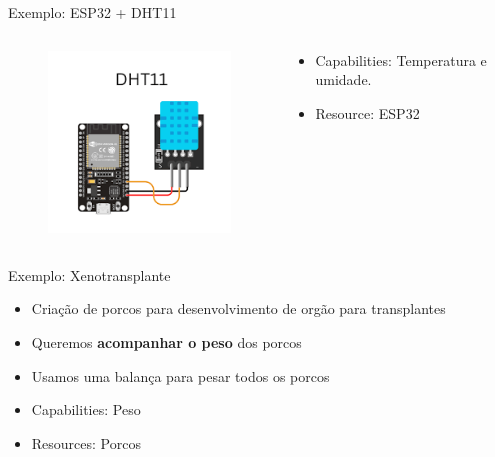 \documentclass[aspectratio=169,xcolor=dvipsnames]{beamer}
\begin{document}
\begin{frame}{Exemplo: ESP32 + DHT11}
\begin{columns}
    \begin{column}{0.48\textwidth}
    \begin{figure}
    \centering
    \includegraphics[width=1\linewidth]{Figuras/DHT11-ESP32.png}
    \end{figure}
    \end{column}
    \begin{column}{0.48\textwidth}
    \begin{itemize}
        \item Capabilities: Temperatura e umidade.
        \item Resource: ESP32
    \end{itemize}
    \end{column}

\end{columns}

\end{frame}

\begin{frame}{Exemplo: Xenotransplante}
    \begin{itemize}
        \item Criação de porcos para desenvolvimento de orgão para transplantes
        \item Queremos \textbf{acompanhar o peso} dos porcos
        \item Usamos uma balança para pesar todos os porcos
    \end{itemize}
    \vspace{1cm}
    \pause
    \begin{itemize}
        \item Capabilities: Peso
        \item Resources: Porcos
    \end{itemize}
\end{frame}
\end{document}
